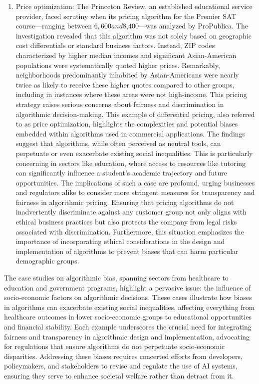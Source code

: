 \documentclass[10pt]{article}
\begin{document}
\begin{enumerate}
    \item Price optimization: The Princeton Review, an established educational service provider, faced scrutiny when its pricing algorithm for the Premier SAT course—ranging between $6,600 and $8,400—was analyzed by ProPublica. The investigation revealed that this algorithm was not solely based on geographic cost differentials or standard business factors. Instead, ZIP codes characterized by higher median incomes and significant Asian-American populations were systematically quoted higher prices. Remarkably, neighborhoods predominantly inhabited by Asian-Americans were nearly twice as likely to receive these higher quotes compared to other groups, including in instances where these areas were not high-income. This pricing strategy raises serious concerns about fairness and discrimination in algorithmic decision-making. This example of differential pricing, also referred to as price optimization, highlights the complexities and potential biases embedded within algorithms used in commercial applications. The findings suggest that algorithms, while often perceived as neutral tools, can perpetuate or even exacerbate existing social inequalities. This is particularly concerning in sectors like education, where access to resources like tutoring can significantly influence a student's academic trajectory and future opportunities. The implications of such a case are profound, urging businesses and regulators alike to consider more stringent measures for transparency and fairness in algorithmic pricing. Ensuring that pricing algorithms do not inadvertently discriminate against any customer group not only aligns with ethical business practices but also protects the company from legal risks associated with discrimination. Furthermore, this situation emphasizes the importance of incorporating ethical considerations in the design and implementation of algorithms to prevent biases that can harm particular demographic groups.
  \end{enumerate}

  The case studies on algorithmic bias, spanning sectors from healthcare to education and government programs, highlight a pervasive issue: the influence of socio-economic factors on algorithmic decisions. These cases illustrate how biases in algorithms can exacerbate existing social inequalities, affecting everything from healthcare outcomes in lower socio-economic groups to educational opportunities and financial stability. Each example underscores the crucial need for integrating fairness and transparency in algorithmic design and implementation, advocating for regulations that ensure algorithms do not perpetuate socio-economic disparities. Addressing these biases requires concerted efforts from developers, policymakers, and stakeholders to revise and regulate the use of AI systems, ensuring they serve to enhance societal welfare rather than detract from it.
\end{document}
